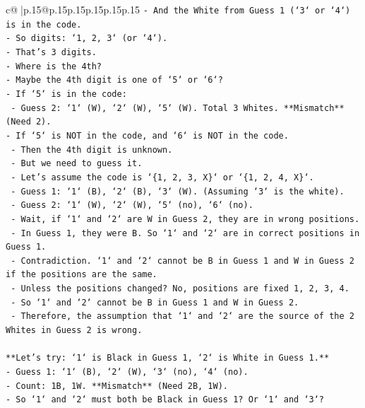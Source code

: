 \documentclass{article}
\begin{document}
{\begin{supertabular}{c@{$\;$}|p{.15\linewidth}@{}p{.15\linewidth}p{.15\linewidth}p{.15\linewidth}p{.15\linewidth}p{.15\linewidth}}
{{{\texttt{{-} And the White from Guess 1 (`3` or `4`) is in the code.} \\
\texttt{{-} So digits: `1, 2, 3` (or `4`).} \\
\texttt{{-} That's 3 digits.} \\
\texttt{{-} Where is the 4th?} \\
\texttt{{-} Maybe the 4th digit is one of `5` or `6`?} \\
\texttt{{-} If `5` is in the code:} \\
\texttt{    {-} Guess 2: `1` (W), `2` (W), `5` (W). Total 3 Whites. **Mismatch** (Need 2).} \\
\texttt{{-} If `5` is NOT in the code, and `6` is NOT in the code.} \\
\texttt{    {-} Then the 4th digit is unknown.} \\
\texttt{    {-} But we need to guess it.} \\
\texttt{    {-} Let's assume the code is `\{1, 2, 3, X\}` or `\{1, 2, 4, X\}`.} \\
\texttt{    {-} Guess 1: `1` (B), `2` (B), `3` (W). (Assuming `3` is the white).} \\
\texttt{    {-} Guess 2: `1` (W), `2` (W), `5` (no), `6` (no).} \\
\texttt{    {-} Wait, if `1` and `2` are W in Guess 2, they are in wrong positions.} \\
\texttt{    {-} In Guess 1, they were B. So `1` and `2` are in correct positions in Guess 1.} \\
\texttt{    {-} Contradiction. `1` and `2` cannot be B in Guess 1 and W in Guess 2 if the positions are the same.} \\
\texttt{    {-} Unless the positions changed? No, positions are fixed 1, 2, 3, 4.} \\
\texttt{    {-} So `1` and `2` cannot be B in Guess 1 and W in Guess 2.} \\
\texttt{    {-} Therefore, the assumption that `1` and `2` are the source of the 2 Whites in Guess 2 is wrong.} \\
\\ 
\texttt{**Let's try: `1` is Black in Guess 1, `2` is White in Guess 1.**} \\
\texttt{{-} Guess 1: `1` (B), `2` (W), `3` (no), `4` (no).} \\
\texttt{{-} Count: 1B, 1W. **Mismatch** (Need 2B, 1W).} \\
\texttt{{-} So `1` and `2` must both be Black in Guess 1? Or `1` and `3`?} \\
}}}
\end{supertabular}}
\end{document}
